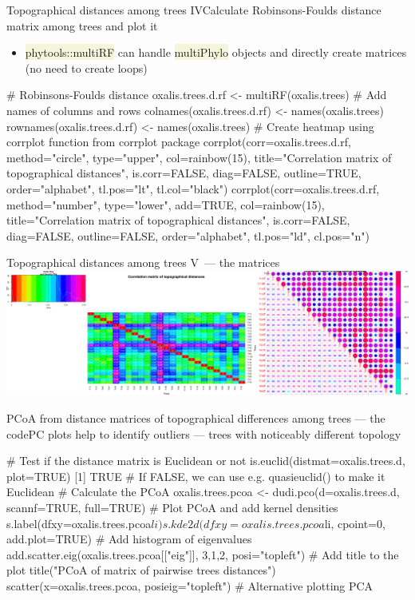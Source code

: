 \documentclass[compress, ucs, xelatex, 11pt, xcolor=svgnames, aspectratio=169,
	hyperref={
		bookmarks=true,
		unicode=true,
		colorlinks=true,
		pdftitle={Molecular data in R},
		plainpages=false,
		pdfauthor={Vojtech Zeisek},
		pdfsubject={Course about phylogeny and evolution in R},
		pdfcreator={XeLaTeX},
		pdfkeywords={R, evolution, phylogeny, molecular data},
		linkcolor=Crimson, %
		anchorcolor=Magenta, %
		citecolor=Magenta, %
		filecolor=Magenta, %
		menucolor=Magenta, %
		urlcolor=DodgerBlue, %
		pdftex},
	url={hyphens, lowtilde} %
	]{beamer}
\renewcommand{\texttt}[1]{\colorbox{Beige}{{\ttfamily #1}}}
\begin{document}
\begin{frame}[fragile]{Topographical distances among trees IV}{Calculate Robinsons-Foulds distance matrix among trees and plot it}
	\begin{itemize}
		\item \texttt{phytools::multiRF} can handle \texttt{multiPhylo} objects and directly create matrices (no need to create loops)
	\end{itemize}
	\begin{spluscode}
    # Robinsons-Foulds distance
    oxalis.trees.d.rf <- multiRF(oxalis.trees)
    # Add names of columns and rows
    colnames(oxalis.trees.d.rf) <- names(oxalis.trees)
    rownames(oxalis.trees.d.rf) <- names(oxalis.trees)
    # Create heatmap using corrplot function from corrplot package
    corrplot(corr=oxalis.trees.d.rf, method="circle", type="upper",
      col=rainbow(15), title="Correlation matrix of topographical
      distances", is.corr=FALSE, diag=FALSE, outline=TRUE,
      order="alphabet", tl.pos="lt", tl.col="black")
    corrplot(corr=oxalis.trees.d.rf, method="number", type="lower",
      add=TRUE, col=rainbow(15), title="Correlation matrix of
      topographical distances", is.corr=FALSE, diag=FALSE,
      outline=FALSE, order="alphabet", tl.pos="ld", cl.pos="n")
	\end{spluscode}
\end{frame}

\begin{frame}{Topographical distances among trees V~--- the matrices}
	\includegraphics[width=\textwidth]{oxalis-dist.png}
\end{frame}

\begin{frame}[fragile]{PCoA from distance matrices of topographical differences among trees --- the code}{PC plots help to identify outliers --- trees with noticeably different topology}
	\begin{spluscode}
    # Test if the distance matrix is Euclidean or not
    is.euclid(distmat=oxalis.trees.d, plot=TRUE)
    [1] TRUE # If FALSE, we can use e.g. quasieuclid() to make it Euclidean
    # Calculate the PCoA
    oxalis.trees.pcoa <- dudi.pco(d=oxalis.trees.d, scannf=TRUE, full=TRUE)
    # Plot PCoA and add kernel densities
    s.label(dfxy=oxalis.trees.pcoa$li)
    s.kde2d(dfxy=oxalis.trees.pcoa$li, cpoint=0, add.plot=TRUE)
    # Add histogram of eigenvalues
    add.scatter.eig(oxalis.trees.pcoa[["eig"]], 3,1,2, posi="topleft")
    # Add title to the plot
    title("PCoA of matrix of pairwise trees distances")
    scatter(x=oxalis.trees.pcoa, posieig="topleft") # Alternative plotting PCA
	\end{spluscode}
\end{frame}
\end{document}
